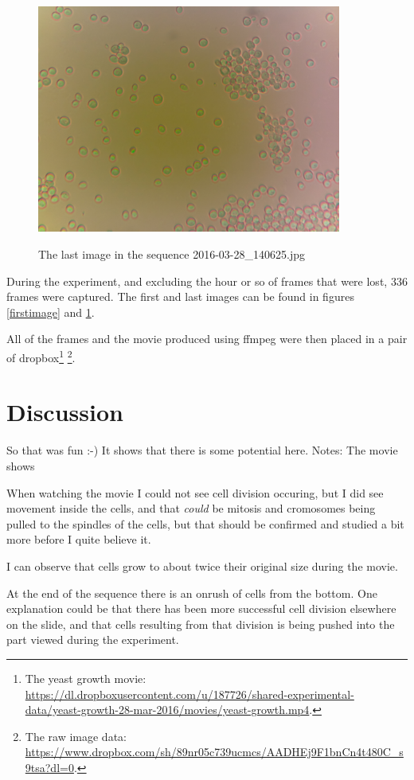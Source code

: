 \documentclass[12pt, a4paper]{article}
\begin{document}
\begin{figure}[th]
\begin{center}
\includegraphics[width=10cm]{images/2016-03-28_140625.jpg}
\label{lastimage}
\caption{The last image in the sequence 2016-03-28\_140625.jpg}
\end{center}
\end{figure}

During the experiment, and excluding the hour or so of frames that
were lost, 336 frames were captured.  The first and last images can be
found in figures \ref{firstimage} and \ref{lastimage}. 

All of the frames and the movie produced using ffmpeg were then placed
in a pair of dropbox\footnote{The yeast growth movie: 
\url{https://dl.dropboxusercontent.com/u/187726/shared-experimental-data/yeast-growth-28-mar-2016/movies/yeast-growth.mp4}.}
\footnote{The raw image data: 
\url{https://www.dropbox.com/sh/89nr05c739ucmcs/AADHEj9F1bnCn4t480C_s9tsa?dl=0}.}.


\section{Discussion}

So that was fun :-)   It shows that there is some potential here.
Notes:  The movie shows

When watching the movie I could not see cell division occuring, but I
did see movement inside the cells, and that \emph{could} be mitosis and
cromosomes being pulled to the spindles of the cells, but that should
be confirmed and studied a bit more before I quite believe it.

I can observe that cells grow to about twice their original size
during the movie.

At the end of the sequence there is an onrush of cells from the
bottom.  One explanation could be that there has been more successful
cell division elsewhere on the slide, and that cells resulting from that division
is being pushed into the part viewed during the experiment.
\end{document}
